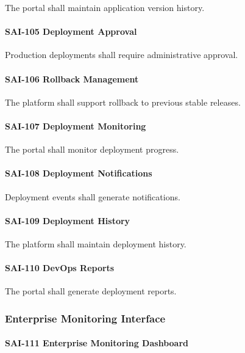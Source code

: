 The portal shall maintain application version history.

\paragraph{SAI-105 Deployment Approval}

Production deployments shall require administrative approval.

\paragraph{SAI-106 Rollback Management}

The platform shall support rollback to previous stable releases.

\paragraph{SAI-107 Deployment Monitoring}

The portal shall monitor deployment progress.

\paragraph{SAI-108 Deployment Notifications}

Deployment events shall generate notifications.

\paragraph{SAI-109 Deployment History}

The platform shall maintain deployment history.

\paragraph{SAI-110 DevOps Reports}

The portal shall generate deployment reports.


\subsubsection*{Enterprise Monitoring Interface}

\paragraph{SAI-111 Enterprise Monitoring Dashboard}

